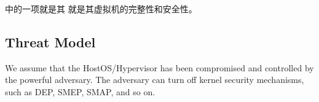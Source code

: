 中的一项就是其
就是其虚拟机的完整性和安全性。




\subsection{Threat Model} \label{sub:thretmodel}
We assume that the HostOS/Hypervisor has been compromised and controlled by the powerful adversary. The adversary can turn off kernel security mechanisms, such as DEP, SMEP, SMAP, and so on. 

